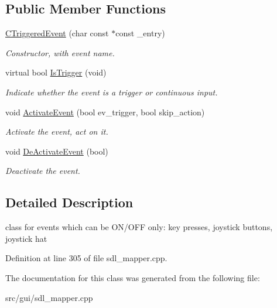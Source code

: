 \subsection*{Public Member Functions}
\begin{DoxyCompactItemize}
\item 
\hypertarget{classCTriggeredEvent_ac9f3fc82121e3632950dfd89e37fc90d}{\hyperlink{classCTriggeredEvent_ac9f3fc82121e3632950dfd89e37fc90d}{C\-Triggered\-Event} (char const $\ast$const \-\_\-entry)}\label{classCTriggeredEvent_ac9f3fc82121e3632950dfd89e37fc90d}

\begin{DoxyCompactList}\small\item\em Constructor, with event name. \end{DoxyCompactList}\item 
\hypertarget{classCTriggeredEvent_a4ab6cb9bc929db0b4281218ff1205cb6}{virtual bool \hyperlink{classCTriggeredEvent_a4ab6cb9bc929db0b4281218ff1205cb6}{Is\-Trigger} (void)}\label{classCTriggeredEvent_a4ab6cb9bc929db0b4281218ff1205cb6}

\begin{DoxyCompactList}\small\item\em Indicate whether the event is a trigger or continuous input. \end{DoxyCompactList}\item 
\hypertarget{classCTriggeredEvent_ab438d4c740739216ae049088f887e6bb}{void \hyperlink{classCTriggeredEvent_ab438d4c740739216ae049088f887e6bb}{Activate\-Event} (bool ev\-\_\-trigger, bool skip\-\_\-action)}\label{classCTriggeredEvent_ab438d4c740739216ae049088f887e6bb}

\begin{DoxyCompactList}\small\item\em Activate the event, act on it. \end{DoxyCompactList}\item 
\hypertarget{classCTriggeredEvent_a14ad33e00067cce7d4a9266888e24192}{void \hyperlink{classCTriggeredEvent_a14ad33e00067cce7d4a9266888e24192}{De\-Activate\-Event} (bool)}\label{classCTriggeredEvent_a14ad33e00067cce7d4a9266888e24192}

\begin{DoxyCompactList}\small\item\em Deactivate the event. \end{DoxyCompactList}\end{DoxyCompactItemize}


\subsection{Detailed Description}
class for events which can be O\-N/\-O\-F\-F only\-: key presses, joystick buttons, joystick hat 

Definition at line 305 of file sdl\-\_\-mapper.\-cpp.



The documentation for this class was generated from the following file\-:\begin{DoxyCompactItemize}
\item 
src/gui/sdl\-\_\-mapper.\-cpp\end{DoxyCompactItemize}
